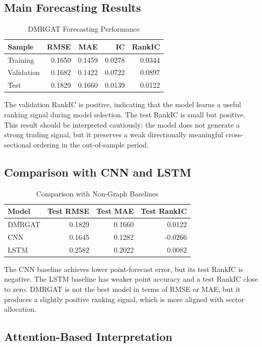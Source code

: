 \documentclass[12pt]{article}
\begin{document}
\subsection{Main Forecasting Results}

\begin{table}[H]
\centering
\caption{DMRGAT Forecasting Performance}
\begin{tabular}{lrrrr}
\toprule
Sample & RMSE & MAE & IC & RankIC \\
\midrule
Training & 0.1650 & 0.1459 & 0.0278 & 0.0344 \\
Validation & 0.1682 & 0.1422 & 0.0722 & 0.0897 \\
Test & 0.1829 & 0.1660 & 0.0139 & 0.0122 \\
\bottomrule
\end{tabular}
\end{table}

The validation RankIC is positive, indicating that the model learns a useful ranking signal during model selection. The test RankIC is small but positive. This result should be interpreted cautiously: the model does not generate a strong trading signal, but it preserves a weak directionally meaningful cross-sectional ordering in the out-of-sample period.

\subsection{Comparison with CNN and LSTM}

\begin{table}[H]
\centering
\caption{Comparison with Non-Graph Baselines}
\begin{tabular}{lrrr}
\toprule
Model & Test RMSE & Test MAE & Test RankIC \\
\midrule
DMRGAT & 0.1829 & 0.1660 & 0.0122 \\
CNN & 0.1645 & 0.1282 & -0.0266 \\
LSTM & 0.2582 & 0.2022 & 0.0082 \\
\bottomrule
\end{tabular}
\end{table}

The CNN baseline achieves lower point-forecast error, but its test RankIC is negative. The LSTM baseline has weaker point accuracy and a test RankIC close to zero. DMRGAT is not the best model in terms of RMSE or MAE, but it produces a slightly positive ranking signal, which is more aligned with sector allocation.

\subsection{Attention-Based Interpretation}
\end{document}
